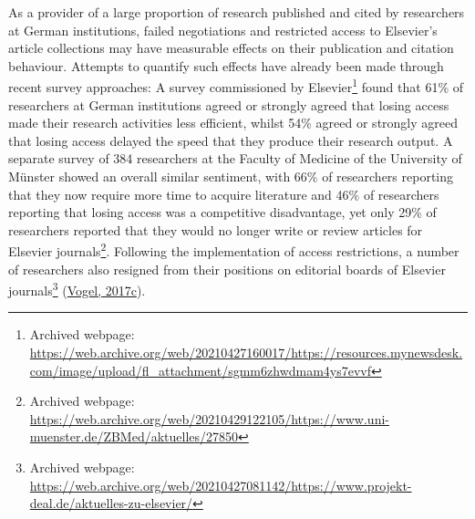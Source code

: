 \documentclass[
]{article}
\begin{document}
As a provider of a large proportion of research published and cited by researchers at German institutions, failed negotiations and restricted access to Elsevier's article collections may have measurable effects on their publication and citation behaviour. Attempts to quantify such effects have already been made through recent survey approaches: A survey commissioned by Elsevier\footnote{Archived webpage: \url{https://web.archive.org/web/20210427160017/https://resources.mynewsdesk.com/image/upload/fl_attachment/sgmm6zhwdmam4ys7evvf}} found that 61\% of researchers at German institutions agreed or strongly agreed that losing access made their research activities less efficient, whilst 54\% agreed or strongly agreed that losing access delayed the speed that they produce their research output. A separate survey of 384 researchers at the Faculty of Medicine of the University of Münster showed an overall similar sentiment, with 66\% of researchers reporting that they now require more time to acquire literature and 46\% of researchers reporting that losing access was a competitive disadvantage, yet only 29\% of researchers reported that they would no longer write or review articles for Elsevier journals\footnote{Archived webpage: \url{https://web.archive.org/web/20210429122105/https://www.uni-muenster.de/ZBMed/aktuelles/27850}}. Following the implementation of access restrictions, a number of researchers also resigned from their positions on editorial boards of Elsevier journals\footnote{Archived webpage: \url{https://web.archive.org/web/20210427081142/https://www.projekt-deal.de/aktuelles-zu-elsevier/}} (\href{https://doi.org/10.1126/science.aar2142}{Vogel, 2017c}).
\end{document}
